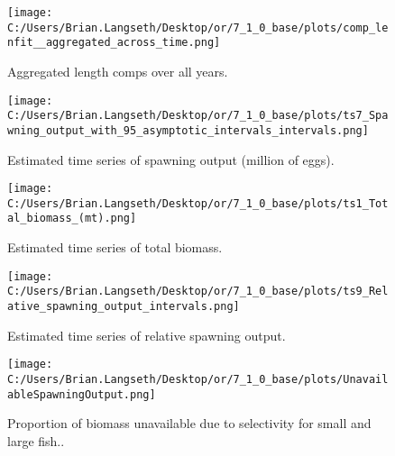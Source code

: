 \documentclass[11pt,
  english,
  a4paper,
]{article}
\begin{document}

\begin{figure}
\centering
\texttt{[image: C:/Users/Brian.Langseth/Desktop/or/7\_1\_0\_base/plots/comp\_lenfit\_\_aggregated\_across\_time.png]}
\caption{Aggregated length comps over all years.\label{fig:agg-len-fit}}
\end{figure}

\tagmcend\tagstructend


\begin{figure}
\centering
\texttt{[image: C:/Users/Brian.Langseth/Desktop/or/7\_1\_0\_base/plots/ts7\_Spawning\_output\_with\_95\_asymptotic\_intervals\_intervals.png]}
\caption{Estimated time series of spawning output (million of eggs).\label{fig:ssb}}
\end{figure}

\tagmcend\tagstructend


\begin{figure}
\centering
\texttt{[image: C:/Users/Brian.Langseth/Desktop/or/7\_1\_0\_base/plots/ts1\_Total\_biomass\_(mt).png]}
\caption{Estimated time series of total biomass.\label{fig:tot-bio}}
\end{figure}

\tagmcend\tagstructend


\begin{figure}
\centering
\texttt{[image: C:/Users/Brian.Langseth/Desktop/or/7\_1\_0\_base/plots/ts9\_Relative\_spawning\_output\_intervals.png]}
\caption{Estimated time series of relative spawning output.\label{fig:depl}}
\end{figure}

\tagmcend\tagstructend


\begin{figure}
\centering
\texttt{[image: C:/Users/Brian.Langseth/Desktop/or/7\_1\_0\_base/plots/UnavailableSpawningOutput.png]}
\caption{Proportion of biomass unavailable due to selectivity for small and large fish..\label{fig:unavail-bio}}
\end{figure}
\end{document}
